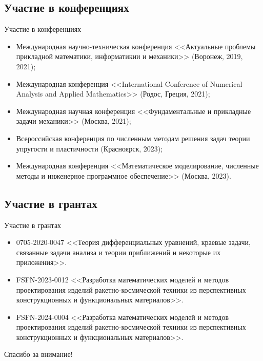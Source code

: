 \subsection{Участие в конференциях}
\begin{frame}{Участие в конференциях}
    \begin{itemize}
    \justifying
        \item Международная научно-техническая конференция <<Актуальные проблемы прикладной математики, информатикии и механики>> (Воронеж, 2019, 2021);
        \item Международная конференция <<International Conference of Nume\-rical Analysis and Applied Mathematics>> (Родос, Греция, 2021);
        \item Международная научная конференция <<Фундаментальные и прикладные задачи механики>> (Москва, 2021);
        \item Всероссийская конференция по численным методам решения задач теории упругости и пластичности (Красноярск, 2023);
        \item Международная конференция <<Математическое моделирование, численные методы и инженерное программное обеспечение>> (Москва, 2023).
    \end{itemize}
\end{frame}

\subsection{Участие в грантах}
\begin{frame}{Участие в грантах}
    \begin{itemize}
    \justifying
        \item 0705-2020-0047 <<Теория дифференциальных уравнений, краевые задачи, связанные задачи анализа и теории приближений и некоторые их приложения>>.
	\item FSFN-2023-0012 <<Разработка математических моделей и методов проектирования изделий ракетно-космической техники из перспективных конструкционных и функциональных материалов>>.
	\item FSFN-2024-0004 <<Разработка математических моделей и методов проектирования изделий ракетно-космической техники из перспективных конструкционных и функциональных материалов>>.
    \end{itemize}
\end{frame}

\begin{frame} %
    \begin{center}
        \Huge
        Спасибо за внимание!
    \end{center}
\end{frame}
